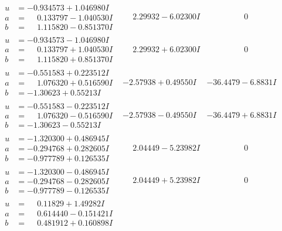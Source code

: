 \documentclass[1p]{elsarticle_modified}
\theoremstyle{definition}
\begin{document}
$$\begin{array}{c|c|c}
\begin{aligned}
u &= -0.934573 + 1.046980 I \\
a &= \phantom{-}0.133797 - 1.040530 I \\
b &= \phantom{-}1.115820 - 0.851370 I\end{aligned}
 & \phantom{-}2.29932 - 6.02300 I & \phantom{-0.000000 } 0 \\ \hline\begin{aligned}
u &= -0.934573 - 1.046980 I \\
a &= \phantom{-}0.133797 + 1.040530 I \\
b &= \phantom{-}1.115820 + 0.851370 I\end{aligned}
 & \phantom{-}2.29932 + 6.02300 I & \phantom{-0.000000 } 0 \\ \hline\begin{aligned}
u &= -0.551583 + 0.223512 I \\
a &= \phantom{-}1.076320 + 0.516590 I \\
b &= -1.30623 + 0.55213 I\end{aligned}
 & -2.57938 + 0.49550 I & -36.4479 - 6.8831 I \\ \hline\begin{aligned}
u &= -0.551583 - 0.223512 I \\
a &= \phantom{-}1.076320 - 0.516590 I \\
b &= -1.30623 - 0.55213 I\end{aligned}
 & -2.57938 - 0.49550 I & -36.4479 + 6.8831 I \\ \hline\begin{aligned}
u &= -1.320300 + 0.486945 I \\
a &= -0.294768 + 0.282605 I \\
b &= -0.977789 + 0.126535 I\end{aligned}
 & \phantom{-}2.04449 - 5.23982 I & \phantom{-0.000000 } 0 \\ \hline\begin{aligned}
u &= -1.320300 - 0.486945 I \\
a &= -0.294768 - 0.282605 I \\
b &= -0.977789 - 0.126535 I\end{aligned}
 & \phantom{-}2.04449 + 5.23982 I & \phantom{-0.000000 } 0 \\ \hline\begin{aligned}
u &= \phantom{-}0.11829 + 1.49282 I \\
a &= \phantom{-}0.614440 - 0.151421 I \\
b &= \phantom{-}0.481912 + 0.160898 I\end{aligned}

\end{array}$$
\end{document}
